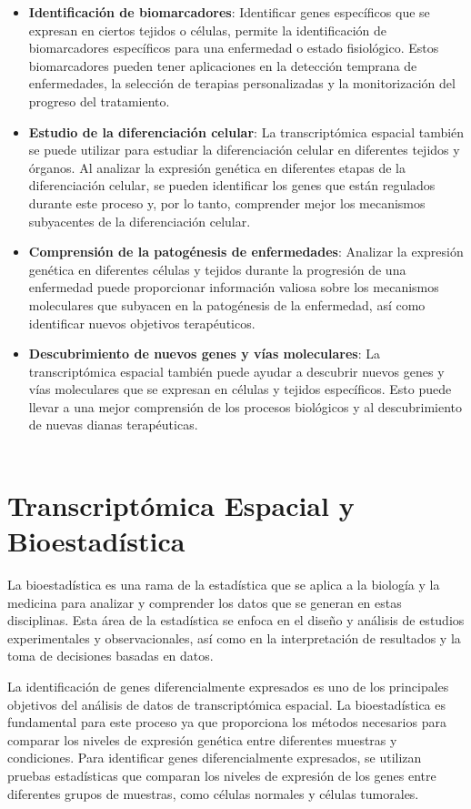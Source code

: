 \documentclass[12pt,oneside]{book} %
\begin{document}
\newpage

\begin{itemize}
\item
\textbf{Identificación de biomarcadores}: Identificar genes específicos que se expresan en ciertos tejidos o células, permite la identificación de biomarcadores específicos para una enfermedad o estado fisiológico. Estos biomarcadores pueden tener aplicaciones en la detección temprana de enfermedades, la selección de terapias personalizadas y la monitorización del progreso del tratamiento.
\item
\textbf{Estudio de la diferenciación celular}: La transcriptómica espacial también se puede utilizar para estudiar la diferenciación celular en diferentes tejidos y órganos. Al analizar la expresión genética en diferentes etapas de la diferenciación celular, se pueden identificar los genes que están regulados durante este proceso y, por lo tanto, comprender mejor los mecanismos subyacentes de la diferenciación celular.
\item
\textbf{Comprensión de la patogénesis de enfermedades}: Analizar la expresión genética en diferentes células y tejidos durante la progresión de una enfermedad puede proporcionar información valiosa sobre los mecanismos moleculares que subyacen en la patogénesis de la enfermedad, así como identificar nuevos objetivos terapéuticos.
\item
\textbf{Descubrimiento de nuevos genes y vías moleculares}: La transcriptómica espacial también puede ayudar a descubrir nuevos genes y vías moleculares que se expresan en células y tejidos específicos. Esto puede llevar a una mejor comprensión de los procesos biológicos y al descubrimiento de nuevas dianas terapéuticas. \\ \\
\end{itemize}


\section{Transcriptómica Espacial y Bioestadística}
La bioestadística es una rama de la estadística que se aplica a la biología y la medicina para analizar y comprender los datos que se generan en estas disciplinas. Esta área de la estadística se enfoca en el diseño y análisis de estudios experimentales y observacionales, así como en la interpretación de resultados y la toma de decisiones basadas en datos.

La identificación de genes diferencialmente expresados es uno de los principales objetivos del análisis de datos de transcriptómica espacial. La bioestadística es fundamental para este proceso ya que proporciona los métodos necesarios para comparar los niveles de expresión genética entre diferentes muestras y condiciones. Para identificar genes diferencialmente expresados, se utilizan pruebas estadísticas que comparan los niveles de expresión de los genes entre diferentes grupos de muestras, como células normales y células tumorales.
\end{document}

